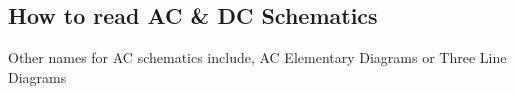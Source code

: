 \subsection{How to read AC \& DC Schematics}

Other names for AC schematics include, AC Elementary Diagrams or Three Line Diagrams